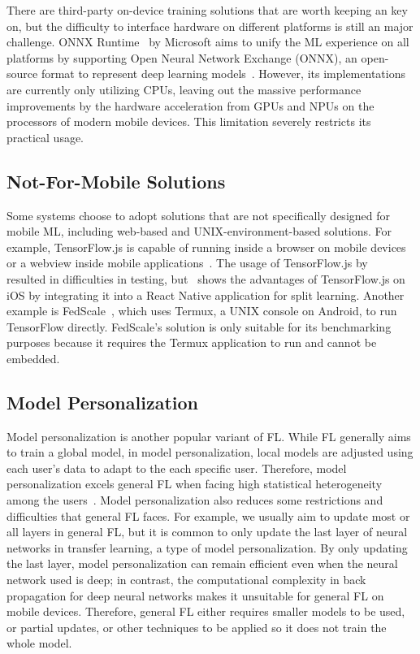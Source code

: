 \documentclass[conference]{IEEEtran}
\begin{document}
There are third-party on-device training solutions that are worth keeping an key on,
but the difficulty to interface hardware on different platforms is
still an major challenge.
ONNX Runtime~\cite{onnxruntime} by Microsoft aims to
unify the ML experience on all platforms by
supporting Open Neural Network Exchange (ONNX),
an open-source format to represent deep learning
models~\cite{ParedesdelRio2020}.
However, its implementations are currently only utilizing CPUs,
leaving out the massive performance improvements by the hardware acceleration
from GPUs and NPUs on the processors of modern mobile devices.
This limitation severely restricts its practical usage.

\subsection{Not-For-Mobile Solutions}

Some systems choose to adopt solutions that are not specifically designed for
mobile ML,
including web-based and UNIX-environment-based solutions.
For example,
TensorFlow.js is capable of running inside a browser on mobile devices or
a webview inside mobile applications~\cite{smilkov2019tensorflow}.
The usage of TensorFlow.js by~\cite{sriraman2022device} resulted in
difficulties in testing,
but~\cite{palanisamy2021spliteasy} shows the advantages of TensorFlow.js on iOS
by integrating it into a React Native application for split learning.
Another example is FedScale~\cite{lai2022fedscale},
which uses Termux, a UNIX console on Android,
to run TensorFlow directly.
FedScale's solution is only suitable for its benchmarking purposes because
it requires the Termux application to run and
cannot be embedded.

\subsection{Model Personalization}

Model personalization is another popular variant of FL.
While FL generally aims to train a global model,
in model personalization,
local models are adjusted using each user's data to
adapt to the each specific user.
Therefore, model personalization excels general FL when
facing high statistical heterogeneity among the users~\cite{kulkarni2020survey}.
Model personalization also reduces some restrictions and difficulties that
general FL faces.
For example,
we usually aim to update most or all layers in general FL,
but it is common to only update the last layer of neural networks in
transfer learning,
a type of model personalization.
By only updating the last layer,
model personalization can remain efficient even when
the neural network used is deep;
in contrast, the computational complexity in back propagation for
deep neural networks makes it unsuitable for general FL on mobile devices.
Therefore, general FL either requires smaller models to be used,
or partial updates,
or other techniques to be applied so it does not train the whole model.
\end{document}
